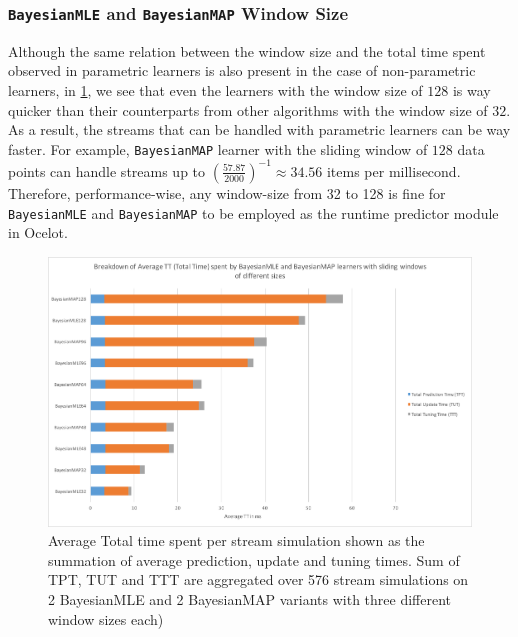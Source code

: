 \subsubsection{\texttt{BayesianMLE} and \texttt{BayesianMAP} Window Size}

Although the same relation between the window size and the total time spent observed in parametric learners is also present in the case of non-parametric learners, in \ref{fig:ws_on_bmle_bmap_tt}, we see that even the learners with the window size of $128$ is way quicker than their counterparts from other algorithms with the window size of $32$. As a result, the streams that can be handled with parametric learners can be way faster. For example, \texttt{BayesianMAP} learner with the sliding window of $128$ data points can handle streams up to $(\frac{57.87}{2000})^{-1}\approx 34.56$ items per millisecond. Therefore, performance-wise, any window-size from 32 to 128 is fine for \texttt{BayesianMLE} and \texttt{BayesianMAP} to be employed as the runtime predictor module in Ocelot.

\begin{figure}[htbp]
  \centering
    \includegraphics[width=\linewidth]{./Figures/ws_on_bmle_bmap_tt.pdf}
  \caption{Average Total time spent per stream simulation shown as the summation of average prediction, update and tuning times. Sum of TPT, TUT and TTT are aggregated over 576 stream simulations on 2 BayesianMLE and 2 BayesianMAP variants with three different window sizes each)}
  \label{fig:ws_on_bmle_bmap_tt}
\end{figure}

